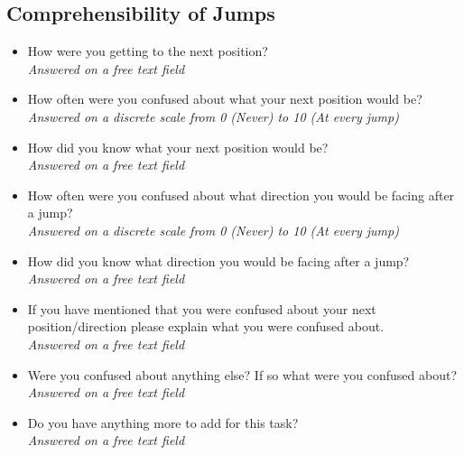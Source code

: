 \subsection{Comprehensibility of Jumps}
\begin{itemize}
	\item How were you getting to the next position?\\
	\textit{Answered on a free text field}
	\item How often were you confused about what your next position would be?\\
	\textit{Answered on a discrete scale from 0 (Never) to 10 (At every jump)}
	\item How did you know what your next position would be?\\
	\textit{Answered on a free text field}
	\item How often were you confused about what direction you would be facing after a jump?\\
	\textit{Answered on a discrete scale from 0 (Never) to 10 (At every jump)}
	\item How did you know what direction you would be facing after a jump?\\
	\textit{Answered on a free text field}
	\item If you have mentioned that you were confused about your next position/direction please explain what you were confused about.\\
	\textit{Answered on a free text field}
	\item Were you confused about anything else? If so what were you confused about?\\
	\textit{Answered on a free text field}
	\item Do you have anything more to add for this task?\\
	\textit{Answered on a free text field}
\end{itemize}
